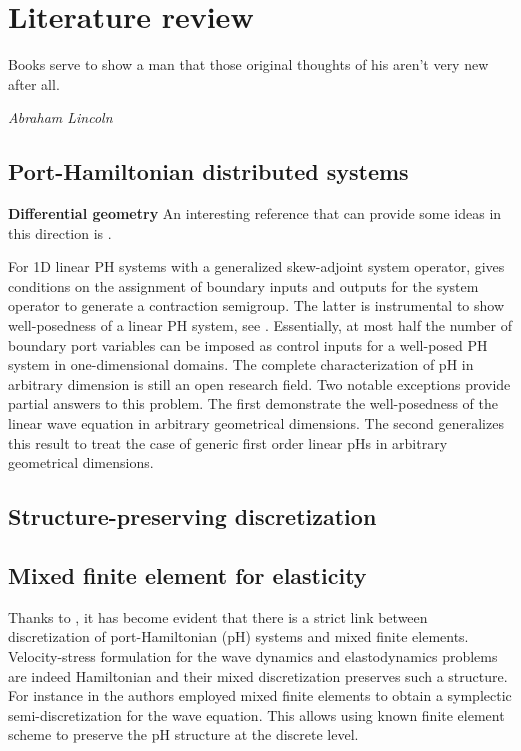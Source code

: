 \chapter[Literature review]{Literature review}

\epigraph{Books serve to show a man that those original thoughts of his aren't very new after all.}{\textit{Abraham Lincoln}}



\section{Port-Hamiltonian distributed systems}
\textbf{Differential geometry}
An interesting reference that can provide some ideas in this direction is \cite{yao2011modeling,nishida2004}. 

 For 1D linear PH systems with a generalized skew-adjoint system operator, \cite{legorrec2005} gives conditions on the assignment of boundary inputs and outputs for the system operator to generate a contraction semigroup. The latter is instrumental to show well-posedness of a linear PH system, see \cite{zwart2012}. Essentially, at most half the number of boundary port variables
can be imposed as control inputs for a well-posed PH system in one-dimensional domains. The complete characterization of pH in arbitrary dimension is still an open research field. Two notable exceptions \cite{zwart2015wave,skrepek2019wellposedness} provide partial answers to this problem. The first demonstrate the well-posedness of the linear wave equation in arbitrary geometrical dimensions. The second generalizes this result to treat the case of generic first order linear pHs in arbitrary geometrical dimensions. \\


\section{Structure-preserving discretization}

\section{Mixed finite element for elasticity}

Thanks to \cite{CardosoRibeiro2018}, it has become evident that there is a strict link between  discretization of port-Hamiltonian (pH) systems and mixed finite elements. Velocity-stress formulation for the wave dynamics and elastodynamics problems are indeed Hamiltonian and their mixed discretization preserves such a structure. For instance in \cite{kirby2015} the authors employed mixed finite elements to obtain a  symplectic semi-discretization for the wave equation. This allows using known finite element scheme to preserve the pH structure at the discrete level.

